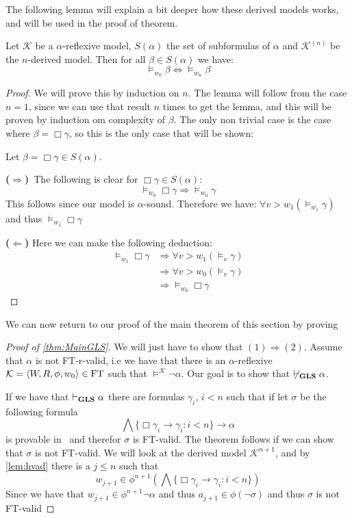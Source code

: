 \documentclass[../main.tex]{subfiles}
\begin{document}
The following lemma will explain a bit deeper how these derived models works,
and will be used in the proof of theorem.

\begin{lem}
	\label{lem:GLS}
	Let $\mathcal{K}$ be a $\alpha$-reflexive model, $S(\alpha)$ the set of
	subformulas of $\alpha$ and $\mathcal{K}^{(n)}$ be the $n$-derived
	model. Then for all $\beta\in S(\alpha)$ we have:
	$$\vDash_{w_0}\beta\Leftrightarrow\vDash_{w_n}\beta$$
\end{lem}
\begin{proof}
	We will prove this by induction on $n$. The lemma will follow from the
	case $n=1$, since we can use that result $n$ times to get the lemma, and this will be proven by induction om complexity
	of $\beta$. The only non trivial case is the case where
	$\beta=\Box\gamma$, so this is the only case that will be shown:

	Let $\beta=\Box\gamma\in S(\alpha)$. 

	\textbf{($\Rightarrow$)}\ The following is clear for
	$\Box\gamma\in S(\alpha)$:
	$$\vDash_{w_0}\Box\gamma\Rightarrow\vDash_{w_0}\gamma$$
	This follows since our model is $\alpha$-sound. Therefore we have:
	$\forall v>w_1(\vDash_{w_1}\gamma)$ and thus $\vDash_{w_1}\Box\gamma$

	\textbf{($\Leftarrow$)} Here we can make the following deduction:
	\begin{align*}
		\vDash_{w_1}\Box\gamma&\Rightarrow\forall
		v>w_1(\vDash_v\gamma)\\
				      &\Rightarrow\forall
				      v>w_0(\vDash_v\gamma)\\
				      &\Rightarrow\vDash_{w_0}\Box\gamma
	\end{align*}
\end{proof}
We can now return to our proof of the main theorem of this section by proving
\begin{proof}[Proof of \ref{thm:MainGLS}]
	We will just have to show that $(1)\Rightarrow (2)$.
	Assume that $\alpha$ is not FT-r-valid, i.e we have that there is an
	$\alpha$-reflexive $\mathcal{K}=\langle W,R,\phi,w_0\rangle\in\text{FT}$ such
	that $\vDash^\mathcal{K}\neg\alpha$. Our goal is to show that
	$\not\vdash_{\text{\textbf{GLS}}}\alpha$.

	If we have that $\vdash_{\text{\textbf{GLS}}}\alpha$ there are formulas $\gamma_i$,
	$i<n$ such that if let $\sigma$ be the following formula
	\[\bigwedge\{\Box\gamma_i\rightarrow\gamma_i:i<n\}\rightarrow\alpha\]
	is provable in \GL\ and therefor $\sigma$ is FT-valid. The theorem
	follows if we can show that $\sigma$ is not FT-valid. We will look at
	the derived model $\mathcal{K}^{n+1}$, and by \ref{lem:hvad} there is a
	$j\leq n$ such that
	\[w_{j+1}\in\phi^{n+1}(\bigwedge\{\Box\gamma_i\rightarrow\gamma_i:i<n\})\]
	Since we have that $w_{j+1}\in\phi^{n+1}\neg\alpha$ and thus
	$a_{j+1}\in\phi(\neg\sigma)$ and thus $\sigma$ is not FT-valid
\end{proof}
\end{document}
